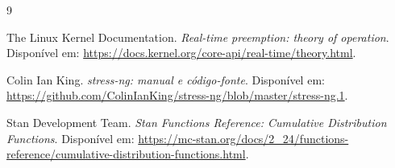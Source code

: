 \documentclass[11pt,a4paper]{article}
\begin{document}
\begin{thebibliography}{9}

The Linux Kernel Documentation.
\emph{Real-time preemption: theory of operation}.
Disponível em:
\url{https://docs.kernel.org/core-api/real-time/theory.html}.

Colin Ian King.
\emph{stress-ng: manual e código-fonte}.
Disponível em:
\url{https://github.com/ColinIanKing/stress-ng/blob/master/stress-ng.1}.

Stan Development Team.
\emph{Stan Functions Reference: Cumulative Distribution Functions}.
Disponível em:
\url{https://mc-stan.org/docs/2_24/functions-reference/cumulative-distribution-functions.html}.

\end{thebibliography}
\end{document}
